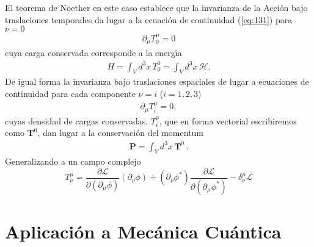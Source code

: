 El teorema de Noether en este caso establece que la invarianza de la Acci\'on bajo traslaciones temporales da lugar a la ecuaci\'on de continuidad (\ref{eq:131}) para $\nu=0$
\begin{align}
\label{eq:122}
  \partial_\mu T^\mu_0=0
\end{align}
cuya carga conservada corresponde a la energ\'\i a
\begin{align}
  H=\int_V d^3x\, T^0_0=\int_V d^3x\,\mathcal{H}.
\end{align}
De igual forma la invarianza bajo traslaciones espaciales de lugar a ecuaciones de continuidad para cada componente $\nu=i$
 ($i=1,2,3$)
 \begin{align}
   \label{eq:235}
   \partial_\mu T^\mu_i=0,
 \end{align}
cuyas densidad de cargas conservadas, $T^0_i$, que en forma vectorial escribiremos como $\mathbf{T}^0$, dan lugar a la conservaci\'on del momentum
\begin{align}
  \mathbf{P}=\int_V d^3x\,\mathbf{T}^0\,.
\end{align}
Generalizando a un campo complejo
\begin{equation}
  \label{eq:138}
     T^\mu_\nu=\frac{\partial\mathcal{L}}{\partial(\partial_\mu\phi)}(\partial_\nu\phi)+(\partial_\nu\phi^*)\frac{\partial\mathcal{L}}{\partial(\partial_\mu\phi^*)}
      -\delta^\mu_\nu\mathcal{L}
\end{equation}




\section{Aplicaci\'on a Mec\'anica Cu\'antica}
\label{sec:aplic-mecan-cuant}

